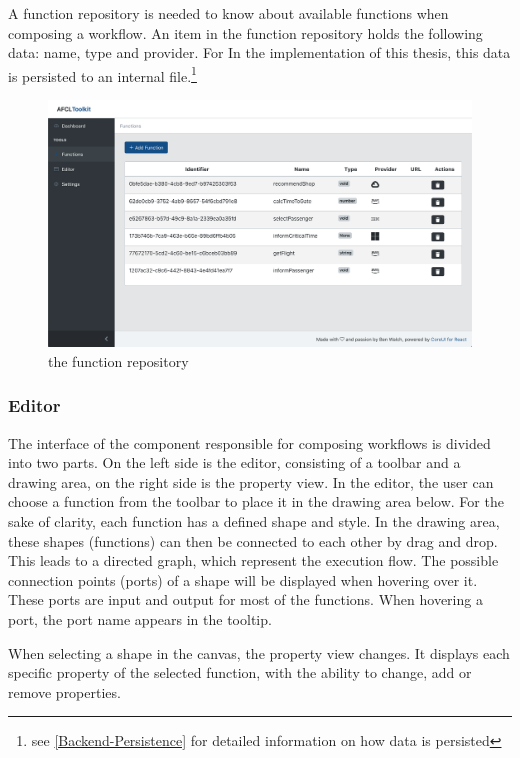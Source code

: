 \documentclass[a4paper,11pt,pdftex,halfparskip,cleardoubleempty,bibtotoc,liststotoc]{scrbook}
\begin{document}
A function repository is needed to know about available functions when composing a workflow. An item in the function repository holds the following data: name, type and provider. For In the implementation of this thesis, this data is persisted to an internal file.\footnote{see \ref{Backend-Persistence} for detailed information on how data is persisted}

\begin{figure}[H]
  \centering
  \includegraphics[width=\textwidth]{functions}
  \caption{the function repository}
\end{figure}

\subsubsection{Editor}
\par
The interface of the component responsible for composing workflows is divided into two parts. On the left side is the editor, consisting of a toolbar and a drawing area, on the right side is the property view. In the editor, the user can choose a function from the toolbar to place it in the drawing area below.  For the sake of clarity, each function has a defined shape and style. In the drawing area, these shapes (functions) can then be connected to each other by drag and drop. This leads to a directed graph, which represent the execution flow. The possible connection points (ports) of a shape will be displayed when hovering over it. These ports are input and output for most of the functions. When hovering a port, the port name appears in the tooltip.
\par
When selecting a shape in the canvas, the property view changes. It displays each specific property of the selected function, with the ability to change, add or remove properties.
\end{document}
